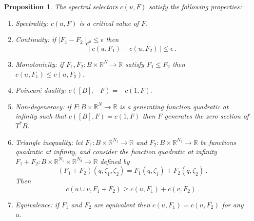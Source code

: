 \documentclass{amsart}
\newtheorem{prop}[thm]{Proposition}
\theoremstyle{remark}
\begin{document}
\begin{prop}\label{proposition: properties Viterbo}
The spectral selectors $c (u, F)$ satisfy the following properties:
\renewcommand{\theenumi}{\roman{enumi}}
\begin{enumerate}
\item \label{properties spectral sel gf: spectrality} \emph{Spectrality:}
$c(u, F)$ is a critical value of $F$.
\item \label{properties spectral sel gf: continuity} \emph{Continuity:}
if $\lvert F_1 - F_2 \, \rvert_{\mathcal{C}^0} \leq \epsilon$
then
$$
\lvert \, c(u, F_1) - c(u, F_2) \, \rvert \leq \epsilon \,.
$$
\item \label{properties spectral sel gf: monotonicity} \emph{Monotonicity:}
if $F_1, F_2: B \times \mathbb{R}^{N} \rightarrow \mathbb{R}$
satisfy $F_1 \leq F_2$
then $c (u, F_1) \leq c (u, F_2)$.
\item \label{properties spectral sel gf: PD} \emph{Poincar\'e duality:}
$c([B], - F) = - c(1, F)$.
\item \label{properties spectral sel gf: non-degeneracy} \emph{Non-degeneracy:}
if $F: B \times \mathbb{R}^N \rightarrow \mathbb{R}$
is a generating function quadratic at infinity
such that $c([B], F) = c(1, F)$
then $F$ generates the zero section of $T^{\ast}B$.
\item \label{properties spectral sel gf: sum} \emph{Triangle inequality:}
let $F_1: B \times \mathbb{R}^{N_1} \rightarrow \mathbb{R}$
and $F_2: B \times \mathbb{R}^{N_2} \rightarrow \mathbb{R}$
be functions quadratic at infinity,
and consider the function quadratic at infinity
$F_1 + F_2: B \times \mathbb{R}^{N_1} \times \mathbb{R}^{N_2} \rightarrow \mathbb{R}$
defined by
\[
(F_1 + F_2) (q, \zeta_1, \zeta_2) = F_1 (q, \zeta_1) + F_2 (q, \zeta_2) \,.
\]
Then
\[
c (u \cup v, F_1 + F_2) \geq c (u, F_1) + c (v, F_2) \,.
\]
\item \label{properties spectral sel gf: equivalence} \emph{Equivalence:}
if $F_1$ and $F_2$ are equivalent
then $c (u, F_1) = c (u, F_2)$ for any $u$.
\end{enumerate}
\end{prop}
\end{document}
